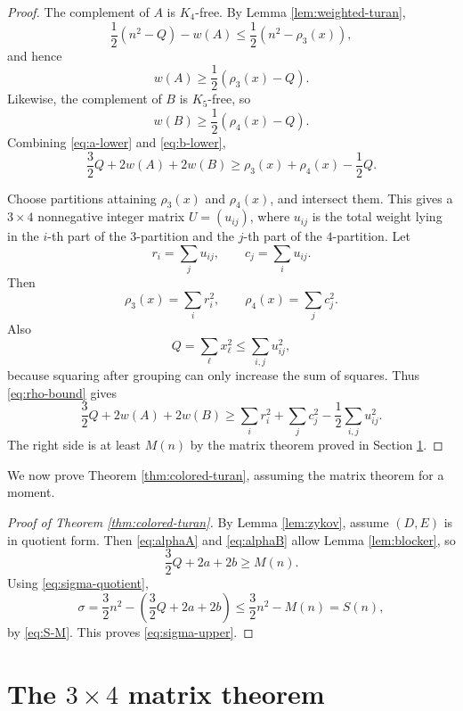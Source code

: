 \documentclass[12pt]{article}
\theoremstyle{plain}
\theoremstyle{definition}
\theoremstyle{remark}
\begin{document}
\begin{proof}
The complement of \(A\) is \(K_4\)-free.  By Lemma \ref{lem:weighted-turan},
\[
  \frac12(n^2-Q)-w(A)
  \le \frac12(n^2-\rho_3(x)),
\]
and hence
\begin{equation}\label{eq:a-lower}
  w(A)\ge\frac12(\rho_3(x)-Q).
\end{equation}
Likewise, the complement of \(B\) is \(K_5\)-free, so
\begin{equation}\label{eq:b-lower}
  w(B)\ge\frac12(\rho_4(x)-Q).
\end{equation}
Combining \eqref{eq:a-lower} and \eqref{eq:b-lower},
\begin{equation}\label{eq:rho-bound}
  \frac32Q+2w(A)+2w(B)
  \ge \rho_3(x)+\rho_4(x)-\frac12Q.
\end{equation}

Choose partitions attaining \(\rho_3(x)\) and \(\rho_4(x)\), and intersect
them.  This gives a \(3\times4\) nonnegative integer matrix
\(U=(u_{ij})\), where \(u_{ij}\) is the total weight lying in the \(i\)-th
part of the \(3\)-partition and the \(j\)-th part of the \(4\)-partition.
Let
\[
  r_i=\sum_j u_{ij},\qquad c_j=\sum_i u_{ij}.
\]
Then
\[
  \rho_3(x)=\sum_i r_i^2,
  \qquad
  \rho_4(x)=\sum_j c_j^2.
\]
Also
\[
  Q=\sum_\ell x_\ell^2\le \sum_{i,j}u_{ij}^2,
\]
because squaring after grouping can only increase the sum of squares.  Thus
\eqref{eq:rho-bound} gives
\[
  \frac32Q+2w(A)+2w(B)
  \ge
  \sum_i r_i^2+
  \sum_j c_j^2-\frac12\sum_{i,j}u_{ij}^2.
\]
The right side is at least \(M(n)\) by the matrix theorem proved in
Section \ref{sec:matrix}.
\end{proof}

We now prove Theorem \ref{thm:colored-turan}, assuming the matrix theorem for a
moment.

\begin{proof}[Proof of Theorem \ref{thm:colored-turan}]
By Lemma \ref{lem:zykov}, assume \((D,E)\) is in quotient form.  Then
\eqref{eq:alphaA} and \eqref{eq:alphaB} allow Lemma \ref{lem:blocker}, so
\[
  \frac32Q+2a+2b\ge M(n).
\]
Using \eqref{eq:sigma-quotient},
\[
  \sigma
  =\frac32n^2-\left(\frac32Q+2a+2b\right)
  \le \frac32n^2-M(n)=S(n),
\]
by \eqref{eq:S-M}.  This proves \eqref{eq:sigma-upper}.
\end{proof}

\section{The \texorpdfstring{\(3\times4\)}{3 x 4} matrix theorem}\label{sec:matrix}
\end{document}
